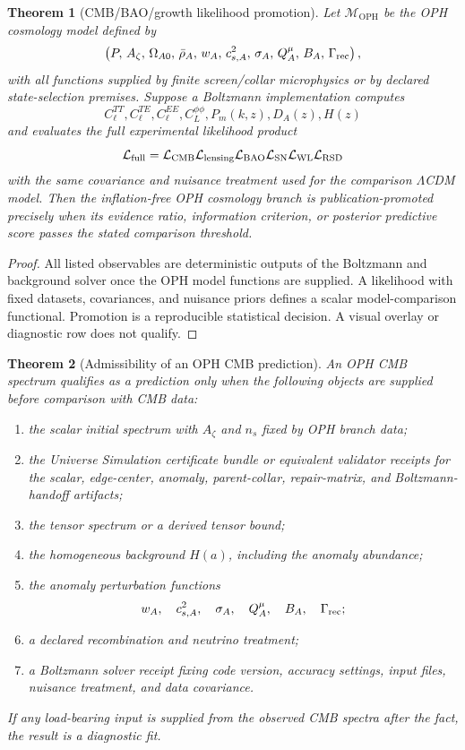 \documentclass[11pt]{article}
\newtheorem{theorem}{Theorem}[section]
\newcommand{\OPH}{\mathrm{OPH}}
\begin{document}
\begin{theorem}[CMB/BAO/growth likelihood promotion]\label{thm:likelihood-promotion}
Let \(\mathcal M_{\OPH}\) be the OPH cosmology model defined by
\[
\left(
P,\,
A_\zeta,\,
\Omega_{A0},\,
\bar\rho_A,\,
w_A,\,
c_{s,A}^2,\,
\sigma_A,\,
Q_A^\mu,\,
B_A,\,
\Gamma_{\rm rec}
\right),
\]
with all functions supplied by finite screen/collar microphysics or by declared state-selection
premises. Suppose a Boltzmann implementation computes
\[
C_\ell^{TT},C_\ell^{TE},C_\ell^{EE},C_L^{\phi\phi},P_m(k,z),D_A(z),H(z)
\]
and evaluates the full experimental likelihood product
\[
\mathcal L_{\rm full}
=
\mathcal L_{\rm CMB}
\mathcal L_{\rm lensing}
\mathcal L_{\rm BAO}
\mathcal L_{\rm SN}
\mathcal L_{\rm WL}
\mathcal L_{\rm RSD}
\]
with the same covariance and nuisance treatment used for the comparison \(\Lambda\)CDM model. Then
the inflation-free OPH cosmology branch is publication-promoted precisely when its evidence ratio,
information criterion, or posterior predictive score passes the stated comparison threshold.
\end{theorem}

\begin{proof}
All listed observables are deterministic outputs of the Boltzmann and background solver once the OPH
model functions are supplied. A likelihood with fixed datasets, covariances, and nuisance priors
defines a scalar model-comparison functional. Promotion is a reproducible statistical decision. A
visual overlay or diagnostic row does not qualify.
\end{proof}

\begin{theorem}[Admissibility of an OPH CMB prediction]\label{thm:cmb-admissibility}
An OPH CMB spectrum qualifies as a prediction only when the following objects are supplied before
comparison with CMB data:
\begin{enumerate}[leftmargin=2em]
\item the scalar initial spectrum with \(A_\zeta\) and \(n_s\) fixed by OPH branch data;
\item the Universe Simulation certificate bundle or equivalent validator receipts for the scalar,
edge-center, anomaly, parent-collar, repair-matrix, and Boltzmann-handoff artifacts;
\item the tensor spectrum or a derived tensor bound;
\item the homogeneous background \(H(a)\), including the anomaly abundance;
\item the anomaly perturbation functions
\[
w_A,\quad c_{s,A}^2,\quad \sigma_A,\quad Q_A^\mu,\quad B_A,\quad \Gamma_{\rm rec};
\]
\item a declared recombination and neutrino treatment;
\item a Boltzmann solver receipt fixing code version, accuracy settings, input files, nuisance
treatment, and data covariance.
\end{enumerate}
If any load-bearing input is supplied from the observed CMB spectra after the fact, the result is a
diagnostic fit.
\end{theorem}
\end{document}
